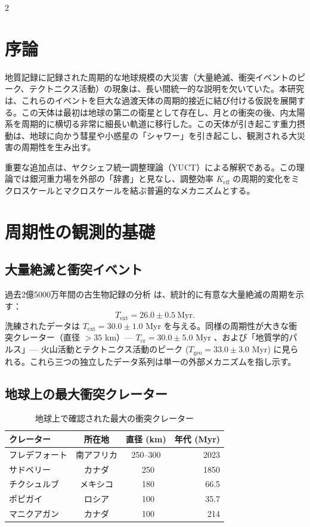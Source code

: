 \documentclass[12pt,a4paper]{article}
\begin{document}
	\begin{multicols}{2}
		
		\section{序論}
		地質記録に記録された周期的な地球規模の大災害（大量絶滅、衝突イベントのピーク、テクトニクス活動）の現象は、長い間統一的な説明を欠いていた。本研究は、これらのイベントを巨大な過渡天体の周期的接近に結び付ける仮説を展開する。この天体は最初は地球の第二の衛星として存在し、月との衝突の後、内太陽系を周期的に横切る非常に細長い軌道に移行した。この天体が引き起こす重力摂動は、地球に向かう彗星や小惑星の「シャワー」を引き起こし、観測される大災害の周期性を生み出す。
		
		重要な追加点は、ヤクシェフ統一調整理論（YUCT）による解釈である。この理論では銀河重力場を外部の「辞書」と見なし、調整効率 \(K_{\mathrm{eff}}\) の周期的変化をミクロスケールとマクロスケールを結ぶ普遍的なメカニズムとする。
		
		\section{周期性の観測的基礎}
		\subsection{大量絶滅と衝突イベント}
		過去2億5000万年間の古生物記録の分析 \cite{Raup1984, Melott2010} は、統計的に有意な大量絶滅の周期を示す：
		\[
		T_{\text{ext}} = 26.0 \pm 0.5\ \text{Myr}.
		\]
		洗練されたデータは \(T_{\text{ext}} = 30.0 \pm 1.0\) Myr を与える。同様の周期性が大きな衝突クレーター（直径 \(>35\) km）— \(T_{\text{cr}} = 30.0 \pm 5.0\) Myr \cite{RampinoStothers1984}、および「地質学的パルス」— 火山活動とテクトニクス活動のピーク (\(T_{\text{geo}} = 33.0 \pm 3.0\) Myr) に見られる。これら三つの独立したデータ系列は単一の外部メカニズムを指し示す。
		
		\subsection{地球上の最大衝突クレーター}
		\begin{table}[htbp]
			\centering
			\caption{地球上で確認された最大の衝突クレーター}
			\label{tab:craters}
			\footnotesize
			\begin{tabular}{lccr}
				\toprule
				\textbf{クレーター} & \textbf{所在地} & \textbf{直径 (km)} & \textbf{年代 (Myr)} \\
				\midrule
				フレデフォート & 南アフリカ & 250–300 & 2023 \\
				サドベリー & カナダ & ~250 & 1850 \\
				チクシュルブ & メキシコ & ~180 & 66.5 \\
				ポピガイ & ロシア & ~100 & 35.7 \\
				マニクアガン & カナダ & ~100 & 214 \\
				\bottomrule
			\end{tabular}
		\end{table}
		

\end{multicols}
\end{document}
